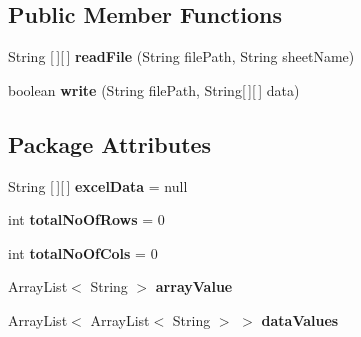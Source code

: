 \subsection*{Public Member Functions}
\begin{DoxyCompactItemize}
\item 
\hypertarget{classcom_1_1zeuslearning_1_1automation_1_1io_1_1ExcelFileOps_a0f078fefa719dbf240ea6fb3b8258860}{}\label{classcom_1_1zeuslearning_1_1automation_1_1io_1_1ExcelFileOps_a0f078fefa719dbf240ea6fb3b8258860} 
String \mbox{[}$\,$\mbox{]}\mbox{[}$\,$\mbox{]} {\bfseries read\+File} (String file\+Path, String sheet\+Name)
\item 
\hypertarget{classcom_1_1zeuslearning_1_1automation_1_1io_1_1ExcelFileOps_a09b4fe40b2481f80b7e30657ce251cae}{}\label{classcom_1_1zeuslearning_1_1automation_1_1io_1_1ExcelFileOps_a09b4fe40b2481f80b7e30657ce251cae} 
boolean {\bfseries write} (String file\+Path, String\mbox{[}$\,$\mbox{]}\mbox{[}$\,$\mbox{]} data)
\end{DoxyCompactItemize}
\subsection*{Package Attributes}
\begin{DoxyCompactItemize}
\item 
\hypertarget{classcom_1_1zeuslearning_1_1automation_1_1io_1_1ExcelFileOps_a21b71f4ace458b34aaabd8d2d0cc54f3}{}\label{classcom_1_1zeuslearning_1_1automation_1_1io_1_1ExcelFileOps_a21b71f4ace458b34aaabd8d2d0cc54f3} 
String \mbox{[}$\,$\mbox{]}\mbox{[}$\,$\mbox{]} {\bfseries excel\+Data} = null
\item 
\hypertarget{classcom_1_1zeuslearning_1_1automation_1_1io_1_1ExcelFileOps_aa75f0d7394b4101703ae29a7e30e64a7}{}\label{classcom_1_1zeuslearning_1_1automation_1_1io_1_1ExcelFileOps_aa75f0d7394b4101703ae29a7e30e64a7} 
int {\bfseries total\+No\+Of\+Rows} = 0
\item 
\hypertarget{classcom_1_1zeuslearning_1_1automation_1_1io_1_1ExcelFileOps_ac28c8b333d715fc0a4b8853e8e63fd37}{}\label{classcom_1_1zeuslearning_1_1automation_1_1io_1_1ExcelFileOps_ac28c8b333d715fc0a4b8853e8e63fd37} 
int {\bfseries total\+No\+Of\+Cols} = 0
\item 
\hypertarget{classcom_1_1zeuslearning_1_1automation_1_1io_1_1ExcelFileOps_ac9f0ea166e1af360243e79f4bcc2db8a}{}\label{classcom_1_1zeuslearning_1_1automation_1_1io_1_1ExcelFileOps_ac9f0ea166e1af360243e79f4bcc2db8a} 
Array\+List$<$ String $>$ {\bfseries array\+Value}
\item 
\hypertarget{classcom_1_1zeuslearning_1_1automation_1_1io_1_1ExcelFileOps_ae47ccacd151ea7a5b71d672e1aa8eafe}{}\label{classcom_1_1zeuslearning_1_1automation_1_1io_1_1ExcelFileOps_ae47ccacd151ea7a5b71d672e1aa8eafe} 
Array\+List$<$ Array\+List$<$ String $>$ $>$ {\bfseries data\+Values}
\end{DoxyCompactItemize}

